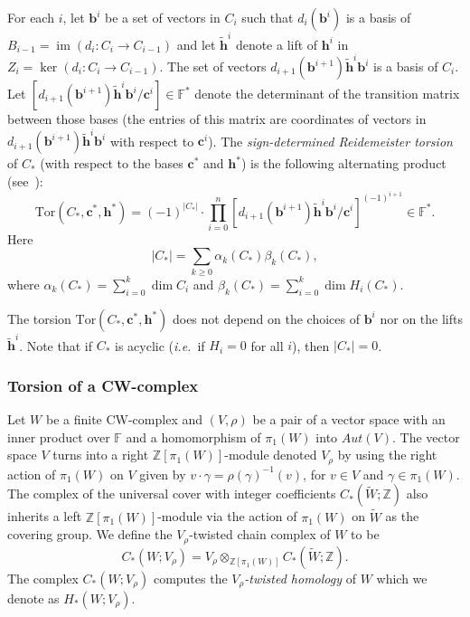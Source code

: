 \documentclass[a4paper]{amsart}
\theoremstyle{plain}
\theoremstyle{definition}
\theoremstyle{remark}
\newcommand{\ie}{\emph{i.e.}}
\newcommand{\mygeq}{\geqslant}
\newcommand{\ZZ}{{\mathbb Z}}
\newcommand{\FF}{{\mathbb F}}
\newcommand{\im}{\mathop{\mathrm{im}}\nolimits}
\newcommand{\Tor}[3]{\mathrm{Tor} ({#1}, {#2}, {#3})}
\newcommand{\cbasis}[2][c]{\mathbf{#1}^{#2}}
\newcommand{\bbasis}[2][b]{\mathbf{#1}^{#2}}
\newcommand{\hbasis}[2][h]{\mathbf{#1}^{#2}}
\newcommand{\ucover}[1]{\widetilde{#1}}
\begin{document}
For each $i$, let $\bbasis{i}$ be a set of vectors in $C_{i}$ such that
$d_{i}(\bbasis{i})$ is a basis of 
$B_{i-1}= \im(d_{i} \colon C_{i} \to C_{i-1})$ and 
let $\hbasis[\tilde{h}]{i}$ denote a lift of
$\hbasis{i}$ in $Z_i = \ker(d_{i} \colon C_i \to C_{i-1})$. The set of
vectors $d_{i+1}(\bbasis{i+1})\hbasis[\tilde{h}]{i}\bbasis{i}$ is a
basis of $C_i$. Let
$[d_{i+1}(\bbasis{i+1})\hbasis[\tilde{h}]{i}\bbasis{i}/\cbasis{i}] \in \FF^*$ 
denote the determinant of the transition matrix between those
bases (the entries of this matrix are coordinates of vectors in
$d_{i+1}(\bbasis{i+1})\hbasis[\tilde{h}]{i}\bbasis{i}$ with respect to
$\cbasis{i}$). The \emph{sign-determined Reidemeister torsion} of
$C_*$ (with respect to the bases $\cbasis{*}$ and $\hbasis{*}$) is the
following alternating product (see~\cite[Definition 3.1]{Turaev:2000}):
\begin{equation}\label{def:RTorsion}
  \Tor{C_*}{\cbasis{*}}{\hbasis{*}} 
  = (-1)^{|C_*|} \cdot  
  \prod_{i=0}^n 
  [d_{i+1}(\bbasis{i+1})\hbasis[\tilde{h}]{i}\bbasis{i}/\cbasis{i}]^{(-1)^{i+1}} 
  \in \FF^*.
\end{equation}
Here $$|C_*| = \sum_{k\mygeq 0} \alpha_k(C_*) \beta_k(C_*),$$ where
$\alpha_k(C_*) = \sum_{i=0}^k \dim C_i$ and 
$\beta_k(C_*) = \sum_{i=0}^k \dim H_i(C_*)$.

The torsion $\Tor{C_*}{\cbasis{*}}{\hbasis{*}}$ does not depend on the
choices of $\bbasis{i}$ nor on the lifts $\hbasis[\tilde{h}]{i}$.  Note that if
$C_*$ is acyclic (\ie~if $H_i = 0$ for all $i$), then $|C_*| = 0$.

\subsubsection*{Torsion of a CW-complex}
Let $W$ be a finite CW-complex and $(V, \rho)$ be a pair of a vector
space with an inner product over $\FF$ and a homomorphism of $\pi_1(W)$
into $Aut(V)$.  The vector space $V$ turns into a right $\ZZ[\pi_1(W)]$-module denoted $V_{\rho}$ by using the right
action of $\pi_1(W)$ on $V$ given by $v \cdot \gamma = \rho(\gamma)^{-1}(v)$, for
$v \in V$ and $\gamma \in \pi_1(W)$.  The complex of the universal cover 
with integer coefficients $C_*(\ucover{W}; \ZZ)$ also inherits a left
$\ZZ[\pi_1(W)]$-module via the action of $\pi_1(W)$ on
$\ucover{W}$ as the covering group.
We define the $V_\rho$-twisted
chain complex of $W$ to be
\[
C_*(W; V_\rho) = V_{\rho} \otimes_{\ZZ[\pi_1(W)]} C_*(\ucover{W}; \ZZ).
\]
The complex $C_*(W; V_\rho)$ computes the {\it $V_\rho$-twisted homology} of $W$
which we denote as $H_*(W;V_\rho)$.
\end{document}
